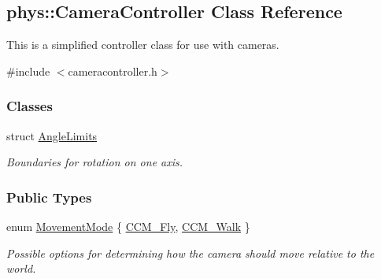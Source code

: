 \hypertarget{classphys_1_1CameraController}{
\subsection{phys::CameraController Class Reference}
\label{de/d70/classphys_1_1CameraController}
}


This is a simplified controller class for use with cameras.  




{\ttfamily \#include $<$cameracontroller.h$>$}

\subsubsection*{Classes}
\begin{DoxyCompactItemize}
\item 
struct \hyperlink{structphys_1_1CameraController_1_1AngleLimits}{AngleLimits}
\begin{DoxyCompactList}\small\item\em Boundaries for rotation on one axis. \item\end{DoxyCompactList}\end{DoxyCompactItemize}
\subsubsection*{Public Types}
\begin{DoxyCompactItemize}
\item 
enum \hyperlink{classphys_1_1CameraController_af7ea701f4b768a0335e8e0115d516af8}{MovementMode} \{ \hyperlink{classphys_1_1CameraController_af7ea701f4b768a0335e8e0115d516af8a0a4e9439e82433de1e7280332f52f26d}{CCM\_\-Fly}, 
\hyperlink{classphys_1_1CameraController_af7ea701f4b768a0335e8e0115d516af8a237d443454262ada472562d7385badac}{CCM\_\-Walk}
 \}
\begin{DoxyCompactList}\small\item\em Possible options for determining how the camera should move relative to the world. \item\end{DoxyCompactList}\end{DoxyCompactItemize}
